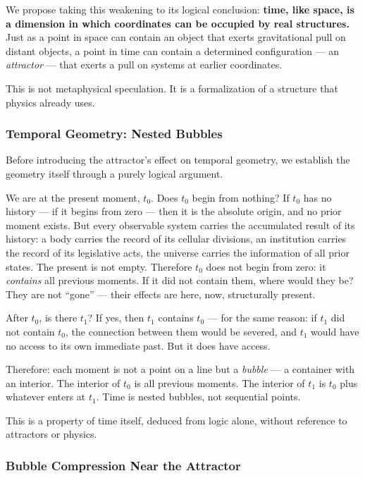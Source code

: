\documentclass[12pt,a4paper]{article}
\begin{document}
We propose taking this weakening to its logical conclusion: \textbf{time, like space, is a dimension in which coordinates can be occupied by real structures.} Just as a point in space can contain an object that exerts gravitational pull on distant objects, a point in time can contain a determined configuration --- an \emph{attractor} --- that exerts a pull on systems at earlier coordinates.

This is not metaphysical speculation. It is a formalization of a structure that physics already uses.

\subsubsection{Temporal Geometry: Nested Bubbles}

Before introducing the attractor's effect on temporal geometry, we establish the geometry itself through a purely logical argument.

We are at the present moment, $t_0$. Does $t_0$ begin from nothing? If $t_0$ has no history --- if it begins from zero --- then it is the absolute origin, and no prior moment exists. But every observable system carries the accumulated result of its history: a body carries the record of its cellular divisions, an institution carries the record of its legislative acts, the universe carries the information of all prior states. The present is not empty. Therefore $t_0$ does not begin from zero: it \emph{contains} all previous moments. If it did not contain them, where would they be? They are not ``gone'' --- their effects are here, now, structurally present.

After $t_0$, is there $t_1$? If yes, then $t_1$ contains $t_0$ --- for the same reason: if $t_1$ did not contain $t_0$, the connection between them would be severed, and $t_1$ would have no access to its own immediate past. But it does have access.

Therefore: each moment is not a point on a line but a \emph{bubble} --- a container with an interior. The interior of $t_0$ is all previous moments. The interior of $t_1$ is $t_0$ plus whatever enters at $t_1$. Time is nested bubbles, not sequential points.

This is a property of time itself, deduced from logic alone, without reference to attractors or physics.

\subsubsection{Bubble Compression Near the Attractor}
\end{document}
